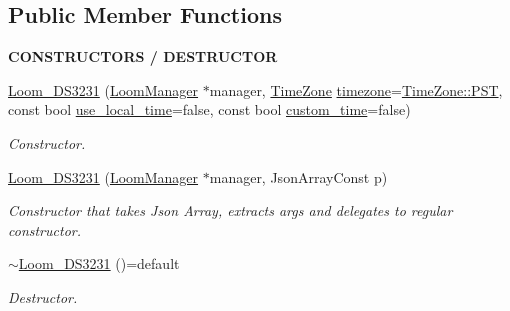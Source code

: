 \subsection*{Public Member Functions}
\begin{Indent}{\bf C\+O\+N\+S\+T\+R\+U\+C\+T\+O\+RS / D\+E\+S\+T\+R\+U\+C\+T\+OR}\par
\begin{DoxyCompactItemize}
\item 
\hyperlink{class_loom___d_s3231_a92679342b390b9d1339f2e196f064dce}{Loom\+\_\+\+D\+S3231} (\hyperlink{class_loom_manager}{Loom\+Manager} $\ast$manager, \hyperlink{class_loom_r_t_c_a103a9db94b031555185bbce688d2527a}{Time\+Zone} \hyperlink{class_loom_r_t_c_a6c1336bf000fd9a385f315d43bbbc5b0}{timezone}=\hyperlink{class_loom_r_t_c_a103a9db94b031555185bbce688d2527aa67d47df7eb52f9e54f467763167398f3}{Time\+Zone\+::\+P\+ST}, const bool \hyperlink{class_loom_r_t_c_a5783620e9af8eb5fa0818aa189483d8e}{use\+\_\+local\+\_\+time}=false, const bool \hyperlink{class_loom_r_t_c_a91c96be6cc3f0f0f4dedbb038f164e73}{custom\+\_\+time}=false)
\begin{DoxyCompactList}\small\item\em Constructor. \end{DoxyCompactList}\item 
\hyperlink{class_loom___d_s3231_a903c3cbd251dc82473eec5163f958ba7}{Loom\+\_\+\+D\+S3231} (\hyperlink{class_loom_manager}{Loom\+Manager} $\ast$manager, Json\+Array\+Const p)
\begin{DoxyCompactList}\small\item\em Constructor that takes Json Array, extracts args and delegates to regular constructor. \end{DoxyCompactList}\item 
\hyperlink{class_loom___d_s3231_aec3af7092dc29fd95f77e068cf4517d7}{$\sim$\+Loom\+\_\+\+D\+S3231} ()=default
\begin{DoxyCompactList}\small\item\em Destructor. \end{DoxyCompactList}\end{DoxyCompactItemize}
\end{Indent}
